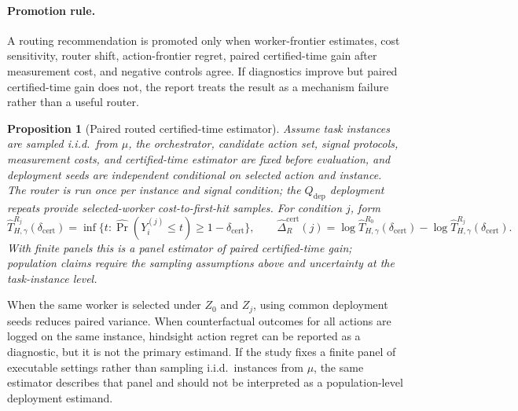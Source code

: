 \documentclass{article}
\newtheorem{proposition}{Proposition}
\begin{document}
\paragraph{Promotion rule.}
A routing recommendation is promoted only when worker-frontier estimates, cost sensitivity, router shift, action-frontier regret, paired certified-time gain after measurement cost, and negative controls agree.
If diagnostics improve but paired certified-time gain does not, the report treats the result as a mechanism failure rather than a useful router.

\begin{proposition}[Paired routed certified-time estimator]
\label{prop:paired-unbiased}
Assume task instances are sampled i.i.d.\ from \(\mu\), the orchestrator, candidate action set, signal protocols, measurement costs, and certified-time estimator are fixed before evaluation, and deployment seeds are independent conditional on selected action and instance.
The router is run once per instance and signal condition; the \(Q_{\mathrm{dep}}\) deployment repeats provide selected-worker cost-to-first-hit samples.
For condition \(j\), form
\[
\widehat T^{R_j}_{H,\gamma}(\delta_{\mathrm{cert}})
=
\inf\{t:\widehat{\Pr}(Y_i^{(j)}\le t)\ge 1-\delta_{\mathrm{cert}}\},
\qquad
\widehat\Delta_R^{\mathrm{cert}}(j)
=
\log\widehat T^{R_0}_{H,\gamma}(\delta_{\mathrm{cert}})
-
\log\widehat T^{R_j}_{H,\gamma}(\delta_{\mathrm{cert}}).
\]
With finite panels this is a panel estimator of paired certified-time gain; population claims require the sampling assumptions above and uncertainty at the task-instance level.
\end{proposition}

When the same worker is selected under \(Z_0\) and \(Z_j\), using common deployment seeds reduces paired variance.
When counterfactual outcomes for all actions are logged on the same instance, hindsight action regret can be reported as a diagnostic, but it is not the primary estimand.
If the study fixes a finite panel of executable settings rather than sampling i.i.d.\ instances from $\mu$, the same estimator describes that panel and should not be interpreted as a population-level deployment estimand.
\end{document}
